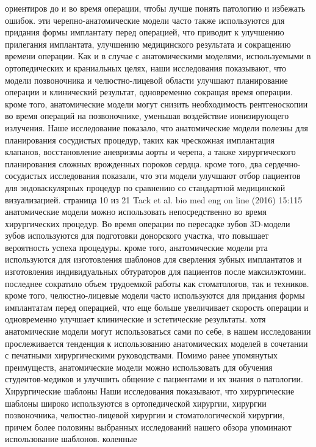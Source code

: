 ориентиров до и во время операции, чтобы лучше понять патологию и избежать
ошибок. эти черепно-анатомические модели часто также используются для придания
формы имплантату перед операцией, что приводит к улучшению прилегания
имплантата, улучшению медицинского результата и сокращению времени операции. Как
и в случае с анатомическими моделями, используемыми в ортопедических и
краниальных целях, наши исследования показывают, что модели позвоночника и
челюстно-лицевой области улучшают планирование операции и клинический результат,
одновременно сокращая время операции. кроме того, анатомические модели могут
снизить необходимость рентгеноскопии во время операций на позвоночнике, уменьшая
воздействие ионизирующего излучения. Наше исследование показало, что
анатомические модели полезны для планирования сосудистых процедур, таких как
чрескожная имплантация клапанов, восстановление аневризмы аорты и черепа, а
также хирургического планирования сложных врожденных пороков сердца. кроме того,
два сердечно-сосудистых исследования показали, что эти модели улучшают отбор
пациентов для эндоваскулярных процедур по сравнению со стандартной медицинской
визуализацией. страница 10 из 21 Tack et al. bio med eng on line (2016) 15:115
анатомические модели можно использовать непосредственно во время хирургических
процедур. Во время операции по пересадке зубов 3D-модели зубов используются для
подготовки донорского участка, что повышает вероятность успеха процедуры. кроме
того, анатомические модели рта используются для изготовления шаблонов для
сверления зубных имплантатов и изготовления индивидуальных обтураторов для
пациентов после максилэктомии. последнее сократило объем трудоемкой работы как
стоматологов, так и техников. кроме того, челюстно-лицевые модели часто
используются для придания формы имплантатам перед операцией, что еще больше
увеличивает скорость операции и одновременно улучшает клинические и эстетические
результаты. хотя анатомические модели могут использоваться сами по себе, в нашем
исследовании прослеживается тенденция к использованию анатомических моделей в
сочетании с печатными хирургическими руководствами. Помимо ранее упомянутых
преимуществ, анатомические модели можно использовать для обучения
студентов-медиков и улучшить общение с пациентами и их знания о патологии.
Хирургические шаблоны Наши исследования показывают, что хирургические шаблоны
широко используются в ортопедической хирургии, хирургии позвоночника,
челюстно-лицевой хирургии и стоматологической хирургии, причем более половины
выбранных исследований нашего обзора упоминают использование шаблонов. коленные
